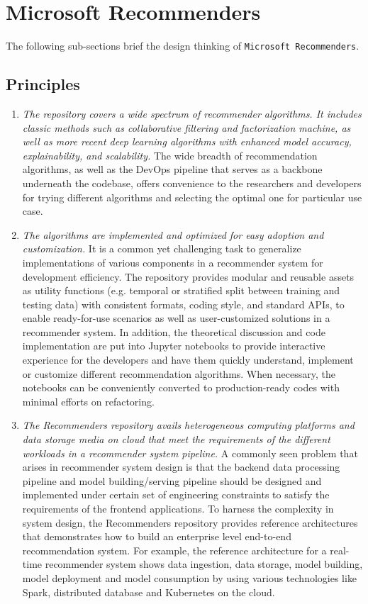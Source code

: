 \documentclass[twoside,11pt]{article}
\begin{document}
\section{Microsoft Recommenders}
The following sub-sections brief the design thinking of \verb|Microsoft Recommenders|.

\subsection{Principles}
\begin{enumerate}
\item \emph{The repository covers a wide spectrum of recommender algorithms. It includes classic methods such as collaborative filtering and factorization machine, as well as more recent deep learning algorithms with enhanced model accuracy, explainability, and scalability.} The wide breadth of recommendation algorithms, as well as the DevOps pipeline that serves as a backbone underneath the codebase, offers convenience to the researchers and developers for trying different algorithms and selecting the optimal one for particular use case. 
\item \emph{The algorithms are implemented and optimized for easy adoption and customization.} It is a common yet challenging task to generalize implementations of various components in a recommender system for development efficiency. The repository provides modular and reusable assets as utility functions (e.g. temporal or stratified split between training and testing data) with consistent formats, coding style, and standard APIs, to enable ready-for-use scenarios as well as user-customized solutions in a recommender system. In addition, the theoretical discussion and code implementation are put into Jupyter notebooks to provide interactive experience for the developers and have them quickly understand, implement or customize different recommendation algorithms. When necessary, the notebooks can be conveniently converted to production-ready codes with minimal efforts on refactoring. 
\item \emph{The Recommenders repository avails heterogeneous computing platforms and data storage media on cloud that meet the requirements of the different workloads in a recommender system pipeline.} A commonly seen problem that arises in recommender system design is that the backend data processing pipeline and model building/serving pipeline should be designed and implemented under certain set of engineering constraints to satisfy the requirements of the frontend applications. To harness the complexity in system design, the Recommenders repository provides reference architectures that demonstrates how to build an enterprise level end-to-end recommendation system. For example, the reference architecture for a real-time recommender system shows data ingestion, data storage, model building, model deployment and model consumption by using various technologies like Spark, distributed database and Kubernetes on the cloud. 
\end{enumerate}
\end{document}
